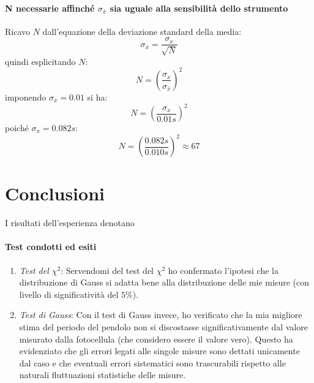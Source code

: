 \documentclass{article}
\begin{document}
	\noindent
	\paragraph{N necessarie affinché $\sigma_{\bar{x}}$ sia uguale alla sensibilità dello strumento}
	Ricavo $N$ dall'equazione della deviazione standard della media:
	\[
	\sigma_{\bar{x}} = \frac{\sigma_{x}}{\sqrt{N}} 
	\]
	quindi esplicitando $N$:
	\[
	N = \left(\frac{\sigma_x}{\sigma_{\bar{x}}}\right)^2
	\]
	imponendo $\sigma_{\bar{x}} = 0.01$ si ha:
	\[
	N = \left(\frac{\sigma_x}{0.01s}\right)^2
	\]
	poiché $\sigma_x = 0.082s$:
	\[
	N = \left(\frac{0.082s}{0.010s}\right)^2 \approx 67
	\]
	
	
	

	\vspace{1.8cm}
	\section{Conclusioni}
	I risultati dell'esperienza denotano
	
	\paragraph{Test condotti ed esiti}
	\begin{enumerate}
		\item \textit{Test del $\chi^2$}: Servendomi del test del $\chi^2$ ho confermato l'ipotesi che la distribuzione di Gauss si adatta bene alla distribuzione delle mie misure (con livello di significatività del $5\%$). 
		\item \textit{Test di Gauss}: Con il test di Gauss invece, ho verificato che la mia migliore stima del periodo del pendolo non si discostasse significativamente dal valore misurato dalla fotocellula (che considero essere il valore vero). Questo ha evidenziato che gli errori legati alle singole misure sono dettati unicamente dal caso e che eventuali errori sistematici sono trascurabili rispetto alle naturali fluttuazioni statistiche delle misure.
	\end{enumerate}
	
\end{document}

